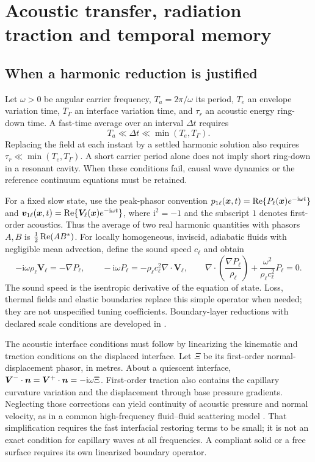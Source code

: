 \section{Acoustic transfer, radiation traction and temporal memory}\label{sec:acoustics}

\subsection{When a harmonic reduction is justified}
Let $\omega>0$ be angular carrier frequency, $T_a=2\pi/\omega$ its period,
$T_e$ an envelope variation time, $T_\Gamma$ an interface variation time, and
$\tau_r$ an acoustic energy ring-down time. A fast-time average over an interval
$\Delta t$ requires
\begin{equation}
 T_a\ll\Delta t\ll\min(T_e,T_\Gamma).
 \label{eq:averaging-separation}
\end{equation}
Replacing the field at each instant by a settled harmonic solution also requires
$\tau_r\ll\min(T_e,T_\Gamma)$. A short carrier period alone does not imply
short ring-down in a resonant cavity. When these conditions fail, causal wave
dynamics or the reference continuum equations must be retained.

For a fixed slow state, use the peak-phasor convention
$p_{1\ell}(\bm x,t)=\operatorname{Re}\{P_\ell(\bm x)e^{-\mathrm i\omega t}\}$ and
$\bm v_{1\ell}(\bm x,t)=\operatorname{Re}\{\bm V_\ell(\bm x)e^{-\mathrm i\omega t}\}$,
where $\mathrm i^2=-1$ and the subscript $1$ denotes first-order acoustics.
Thus the average of two real harmonic quantities with phasors $A,B$ is
$\frac12\operatorname{Re}(AB^*)$. For locally homogeneous, inviscid, adiabatic fluids with
negligible mean advection, define the sound speed $c_\ell$ and obtain
\begin{equation}
 -\mathrm i\omega\rho_\ell\bm V_\ell=-\nabla P_\ell,\qquad
 -\mathrm i\omega P_\ell=-\rho_\ell c_\ell^2\nabla\cdot\bm V_\ell,
 \qquad
 \nabla\cdot\left(\frac{\nabla P_\ell}{\rho_\ell}\right)
       +\frac{\omega^2}{\rho_\ell c_\ell^2}P_\ell=0.
 \label{eq:linear-acoustics}
\end{equation}
The sound speed is the isentropic derivative of the equation of state. Loss,
thermal fields and elastic boundaries replace this simple operator when
needed; they are not unspecified tuning coefficients. Boundary-layer
reductions with declared scale conditions are developed in
\cite{bach2018,jorgensen2021}.

The acoustic interface conditions must follow by linearizing the kinematic and
traction conditions on the displaced interface. Let $\Xi$ be its first-order
normal-displacement phasor, in metres. About a quiescent interface,
$\bm V^-\cdot\bm n=\bm V^+\cdot\bm n=-\mathrm i\omega\Xi$. First-order traction
also contains the capillary curvature variation and the displacement through
base pressure gradients. Neglecting those corrections can yield continuity
of acoustic pressure and normal velocity, as in a common high-frequency
fluid--fluid scattering model \cite{chesneau2022}. That simplification requires
the fast interfacial restoring terms to be small; it is not an exact condition
for capillary waves at all frequencies. A compliant solid or a free surface
requires its own linearized boundary operator.


